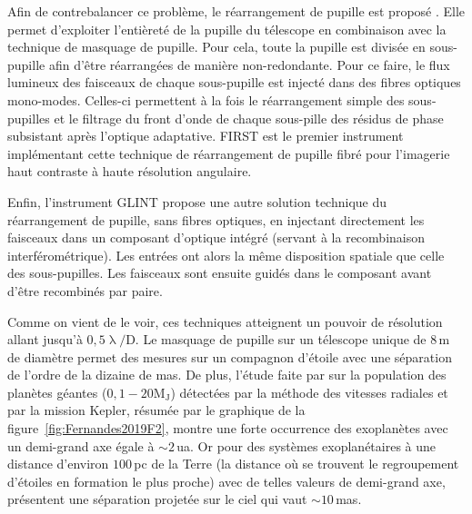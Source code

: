 Afin de contrebalancer ce problème, le réarrangement de pupille est proposé \citep{perrin2006, lacour2007}. Elle permet  d'exploiter l'entièreté de la pupille du télescope en combinaison avec la technique de masquage de pupille. Pour cela, toute la pupille est divisée en sous-pupille afin d'être réarrangées de manière non-redondante. Pour ce faire, le flux lumineux des faisceaux de chaque sous-pupille est injecté dans des fibres optiques mono-modes. Celles-ci permettent à la fois le réarrangement simple des sous-pupilles et le filtrage du front d'onde de chaque sous-pille des résidus de phase subsistant après l'optique adaptative. \ac{FIRST} est le premier instrument implémentant cette technique de réarrangement de pupille fibré \citep{kotani2008} pour l'imagerie haut contraste à haute résolution angulaire.

Enfin, l'instrument \ac{GLINT} \citep{martinod2021} propose une autre solution technique du réarrangement de pupille, sans fibres optiques, en injectant directement les faisceaux dans un composant d'optique intégré (servant à la recombinaison interférométrique). Les entrées ont alors la même disposition spatiale que celle des sous-pupilles. Les faisceaux sont ensuite guidés dans le composant avant d'être recombinés par paire.

Comme on vient de le voir, ces techniques atteignent un pouvoir de résolution allant jusqu'à $0,5 \uplambda / \text{D}$. Le masquage de pupille sur un télescope unique de $8 \,$m de diamètre permet des mesures sur un compagnon d'étoile avec une séparation de l'ordre de la dizaine de mas. De plus, l'étude faite par \cite{fernandes2019} sur la population des planètes géantes ($0,1 - 20 \text{M}_{\text{J}}$) détectées par la méthode des vitesses radiales et par la mission Kepler, résumée par le graphique de la figure~\ref{fig:Fernandes2019F2}, montre une forte occurrence des exoplanètes avec un demi-grand axe égale à $\sim 2 \,$ua. Or pour des systèmes exoplanétaires à une distance d'environ $100 \,$pc de la Terre (la distance où se trouvent le regroupement d'étoiles en formation le plus proche) avec de telles valeurs de demi-grand axe, présentent une séparation projetée sur le ciel qui vaut $\sim 10 \,$mas.

